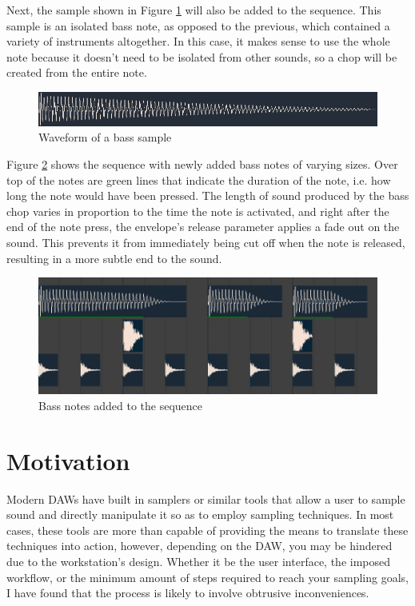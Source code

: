\documentclass[12pt, a4paper, hidelinks]{report}
\begin{document}
	Next, the sample shown in Figure \ref{fig:bass} will also be added to the sequence. This sample is an isolated bass note, as opposed to the previous, which contained a variety of instruments altogether. In this case, it makes sense to use the whole note because it doesn't need to be isolated from other sounds, so a chop will be created from the entire note.
	
	\begin{figure}[h]
		\centering
		\includegraphics[width=\linewidth]{u/bass.png}
		\caption{Waveform of a bass sample}
		\label{fig:bass}
	\end{figure}
	
	Figure \ref{fig:bassseq} shows the sequence with newly added bass notes of varying sizes. Over top of the notes are green lines that indicate the duration of the note, i.e. how long the note would have been pressed. The length of sound produced by the bass chop varies in proportion to the time the note is activated, and right after the end of the note press, the envelope's release parameter applies a fade out on the sound. This prevents it from immediately being cut off when the note is released, resulting in a more subtle end to the sound.
	\begin{figure}[h]
		\centering
		\includegraphics[width=\linewidth]{u/bassseq.png}
		\caption{Bass notes added to the sequence}
		\label{fig:bassseq}
	\end{figure}
	
	
	
	\section{Motivation}
	Modern DAWs have built in samplers or similar tools that allow a user to sample sound and directly manipulate it so as to employ sampling techniques. In most cases, these tools are more than capable of providing the means to translate these techniques into action, however, depending on the DAW, you may be hindered due to the workstation's design. Whether it be the user interface, the imposed workflow, or the minimum amount of steps required to reach your sampling goals, I have found that the process is likely to involve obtrusive inconveniences.\par
	
\end{document}
